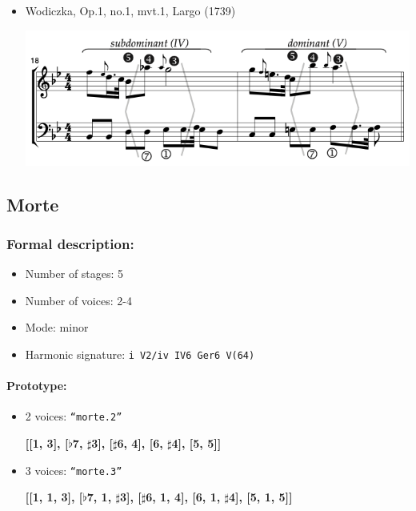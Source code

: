 ﻿\documentclass[11pt, openany]{article}
\begin{document}
\begin{itemize}
\begin{itemize}
\begin{center}
\end{center}
\item Wodiczka, Op.1, no.1, mvt.1, Largo (1739)
\begin{center}
\includegraphics[scale=0.5]{wodiczka1b.png}
\end{center}
\end{itemize}


	\subsection{Morte}
	
\subsubsection{Formal description:}
\begin{itemize}
\item Number of stages: 5
\item Number of voices: 2-4
\item Mode: minor
\item Harmonic signature: \texttt{i V2/iv IV6 Ger6 V(64)}
\end{itemize}

\paragraph{Prototype:}
\begin{itemize}
\item 2 voices: \texttt{“morte.2”}
	\begin{center}
	\textbf{[[1, 3], [$\flat$7, $\sharp$3], [$\sharp$6, 4], [6, $\sharp$4], [5, 5]]}
	\end{center}
\item 3 voices: \texttt{“morte.3”}
	\begin{center}
	\textbf{[[1, 1, 3], [$\flat$7, 1, $\sharp$3], [$\sharp$6, 1, 4], [6, 1, $\sharp$4], [5, 1, 5]]}
	\end{center}
\end{itemize}


\end{itemize}
\end{document}
